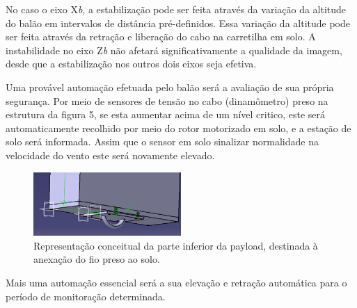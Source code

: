 	No caso o eixo X\textit{b}, a estabilização pode ser feita através da variação da altitude do balão em intervalos de distância pré-definidos. Essa variação da altitude pode ser feita através da retração e liberação do cabo na carretilha em solo. A instabilidade no eixo Z\textit{b} não afetará significativamente a qualidade da imagem, desde que a estabilização nos outros dois eixos seja efetiva. 

	Uma provável automação efetuada pelo balão será a avaliação de sua própria segurança. Por meio de sensores de tensão no cabo (dinamômetro) preso na estrutura da figura 5, se esta aumentar acima de um nível critico, este será automaticamente recolhido por meio do rotor motorizado em solo, e a estação de solo será informada. Assim que o sensor em solo sinalizar normalidade na velocidade do vento este será novamente elevado.

	\begin{figure}[H]
		\centering
		\includegraphics[width=0.5\textwidth]{figuras/parteInferior}
		\caption{Representação conceitual da parte inferior da payload, destinada à anexação do fio preso ao solo.}
		\label{img:parteInferior}
	\end{figure}

	Mais uma automação essencial será a sua elevação e retração automática para o período de monitoração determinada.